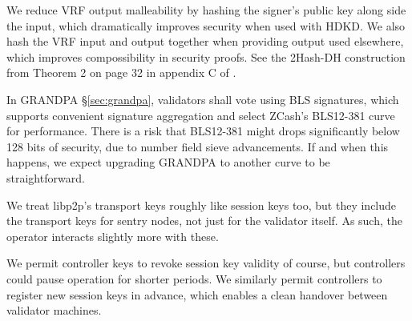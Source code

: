 We reduce VRF output malleability by hashing the signer's public key along side the input, which dramatically improves security when used with HDKD.  We also hash the VRF input and output together when providing output used elsewhere, which improves compossibility in security proofs. See the 2Hash-DH construction from Theorem 2 on page 32 in appendix C of \cite{Praos}.  

In GRANDPA \S\ref{sec:grandpa}, validators shall vote using BLS signatures, which supports convenient signature aggregation and select ZCash's BLS12-381 curve for performance.  There is a risk that BLS12-381 might drops significantly below 128 bits of security, due to number field sieve advancements.  If and when this happens, we expect upgrading GRANDPA to another curve to be straightforward. 


We treat libp2p's transport keys roughly like session keys too, but they include the transport keys for sentry nodes, not just for the validator itself.  As such, the operator interacts slightly more with these.

We permit controller keys to revoke session key validity of course, but controllers could pause operation for shorter periods.  We similarly permit controllers to register new session keys in advance, which enables a clean handover between validator machines.


